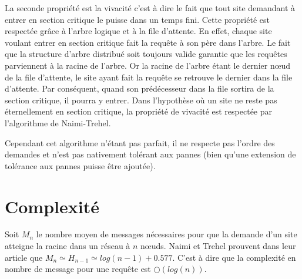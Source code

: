 La seconde propriété est la vivacité c'est à dire le fait que tout site demandant à entrer en section critique le puisse dans un temps fini. Cette propriété est respectée grâce à l'arbre logique et à la file d'attente. En effet, chaque site voulant entrer en section critique fait la requête à son père dans l'arbre. Le fait que la structure d'arbre distribué soit toujours valide garantie que les requêtes parviennent à la racine de l'arbre. Or la racine de l'arbre étant le dernier nœud de la file d'attente, le site ayant fait la requête se retrouve le dernier dans la file d'attente. Par conséquent, quand son prédécesseur dans la file sortira de la section critique, il pourra y entrer. Dans l'hypothèse où un site ne reste pas éternellement en section critique, la propriété de vivacité est respectée par l'algorithme de Naimi-Trehel.

Cependant cet algorithme n'étant pas parfait, il ne respecte pas l'ordre des demandes et n'est pas nativement tolérant aux pannes (bien qu'une extension de tolérance aux pannes \cite{naimi1988} puisse être ajoutée).


\section{Complexité}
Soit $M_n$ le nombre moyen de messages nécessaires pour que la demande d'un site atteigne la racine dans un réseau à $n$ nœuds. Naimi et Trehel prouvent dans leur article \cite{naimi1996} que $M_n \simeq H_{n-1} \simeq log(n-1) + 0.577$. C'est à dire que la complexité en nombre de message pour une requête est $\bigcirc(log(n))$.


